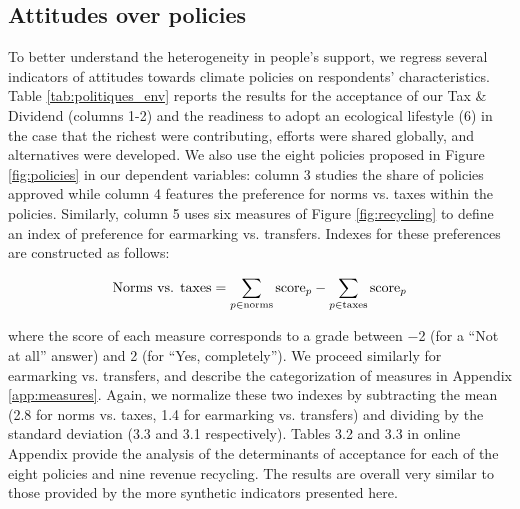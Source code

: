 \documentclass[english,5p,authoryear]{elsarticle}
\begin{document}
    \subsection{Attitudes over policies}\label{sec:determinants_attitudes_policies}

%
To better understand the heterogeneity in people's support, we regress several indicators of attitudes towards climate policies on respondents' characteristics. Table \ref{tab:politiques_env} reports the results for the acceptance of our Tax \& Dividend (columns 1-2) and the readiness to adopt an ecological lifestyle (6) in the case that the richest were contributing, efforts were shared globally, and alternatives were developed. We also use the eight policies proposed in Figure \ref{fig:policies} in our dependent variables: column 3 studies the share of policies approved while column 4 features the preference for norms vs. taxes within the policies. Similarly, column 5 uses six measures of Figure \ref{fig:recycling} to define an index of preference for earmarking vs. transfers. Indexes for these preferences are constructed as follows:

\begin{align}
\textnormal{Norms vs. taxes} = \sum_{p \in \textnormal{norms}} \textnormal{score}_{p} - \sum_{p \in \textnormal{taxes}}  \textnormal{score}_{p}
\label{eq:norms_vs_taxes}
\end{align}

\noindent
where the score of each measure corresponds to a grade between $-$2 (for a ``Not at all'' answer) and 2 (for ``Yes, completely''). We proceed similarly for earmarking vs. transfers, and describe the categorization of measures in Appendix \ref{app:measures}. Again, we normalize these two indexes by subtracting the mean (2.8 for norms vs. taxes, 1.4 for earmarking vs. transfers) and dividing by the standard deviation (3.3 and 3.1 respectively). Tables 3.2 and 3.3 in online Appendix provide the analysis of the determinants of acceptance for each of the eight policies and nine revenue recycling. The results are overall very similar to those provided by the more synthetic indicators presented here.

%
\end{document}

